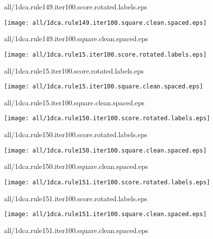 \documentclass{article}
\begin{document}
{\footnotesize all/1dca.rule149.iter100.score.rotated.labels.eps}
\begin{center}
\begin{minipage}{\textwidth}
\texttt{[image: all/1dca.rule149.iter100.square.clean.spaced.eps]}
\end{minipage}
\end{center}
{\footnotesize all/1dca.rule149.iter100.square.clean.spaced.eps}
\begin{center}
\begin{minipage}{\textwidth}
\texttt{[image: all/1dca.rule15.iter100.score.rotated.labels.eps]}
\end{minipage}
\end{center}
{\footnotesize all/1dca.rule15.iter100.score.rotated.labels.eps}
\begin{center}
\begin{minipage}{\textwidth}
\texttt{[image: all/1dca.rule15.iter100.square.clean.spaced.eps]}
\end{minipage}
\end{center}
{\footnotesize all/1dca.rule15.iter100.square.clean.spaced.eps}
\begin{center}
\begin{minipage}{\textwidth}
\texttt{[image: all/1dca.rule150.iter100.score.rotated.labels.eps]}
\end{minipage}
\end{center}
{\footnotesize all/1dca.rule150.iter100.score.rotated.labels.eps}
\begin{center}
\begin{minipage}{\textwidth}
\texttt{[image: all/1dca.rule150.iter100.square.clean.spaced.eps]}
\end{minipage}
\end{center}
{\footnotesize all/1dca.rule150.iter100.square.clean.spaced.eps}
\begin{center}
\begin{minipage}{\textwidth}
\texttt{[image: all/1dca.rule151.iter100.score.rotated.labels.eps]}
\end{minipage}
\end{center}
{\footnotesize all/1dca.rule151.iter100.score.rotated.labels.eps}
\begin{center}
\begin{minipage}{\textwidth}
\texttt{[image: all/1dca.rule151.iter100.square.clean.spaced.eps]}
\end{minipage}
\end{center}
{\footnotesize all/1dca.rule151.iter100.square.clean.spaced.eps}
\end{document}
